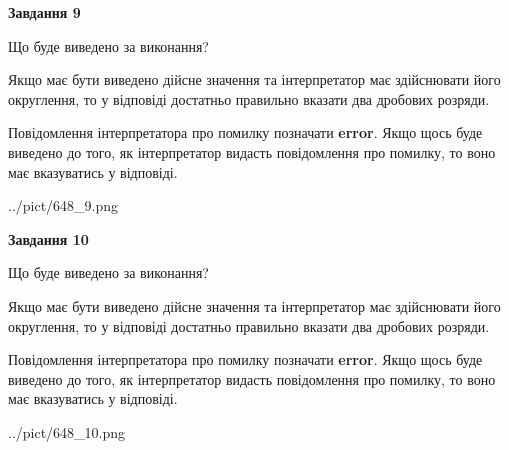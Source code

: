 \documentclass[12pt, ukrainian]{article}
\begin{document}
{\begin {Large}
{\begin {center}\textbf{Завдання 9}\end {center}}\par
Що буде виведено за виконання? \par

Якщо має бути виведено дійсне значення та інтерпретатор має здійснювати його округлення, 
то у відповіді достатньо правильно вказати два дробових розряди.

Повідомлення інтерпретатора про помилку позначати \textbf{error}.
Якщо щось буде виведено до того, як інтерпретатор видасть повідомлення про помилку, 
то воно має вказуватись у відповіді. \par

\begin{center}
	{../pict/648_9.png}
\end{center}
\newpage

{\begin {center}\textbf{Завдання 10}\end {center}}\par
Що буде виведено за виконання? \par

Якщо має бути виведено дійсне значення та інтерпретатор має здійснювати його округлення, 
то у відповіді достатньо правильно вказати два дробових розряди.

Повідомлення інтерпретатора про помилку позначати \textbf{error}.
Якщо щось буде виведено до того, як інтерпретатор видасть повідомлення про помилку, 
то воно має вказуватись у відповіді. \par

\begin{center}
	{../pict/648_10.png}
\end{center}
\newpage

\end {Large}}
\end{document}
